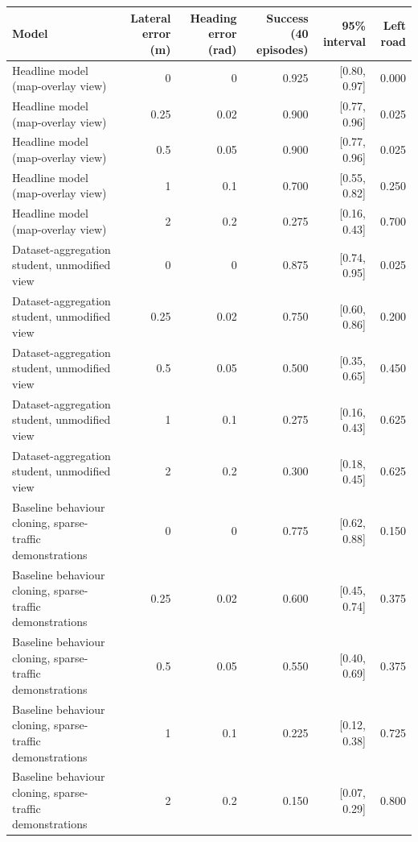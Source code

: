 \begin{tabular}{@{}lrrrrr@{}}\toprule
Model & Lateral error (m) & Heading error (rad) & Success (40 episodes) & 95\% interval & Left road\\\midrule
Headline model (map-overlay view) & 0 & 0 & 0.925 & [0.80, 0.97] & 0.000\\
Headline model (map-overlay view) & 0.25 & 0.02 & 0.900 & [0.77, 0.96] & 0.025\\
Headline model (map-overlay view) & 0.5 & 0.05 & 0.900 & [0.77, 0.96] & 0.025\\
Headline model (map-overlay view) & 1 & 0.1 & 0.700 & [0.55, 0.82] & 0.250\\
Headline model (map-overlay view) & 2 & 0.2 & 0.275 & [0.16, 0.43] & 0.700\\
Dataset-aggregation student, unmodified view & 0 & 0 & 0.875 & [0.74, 0.95] & 0.025\\
Dataset-aggregation student, unmodified view & 0.25 & 0.02 & 0.750 & [0.60, 0.86] & 0.200\\
Dataset-aggregation student, unmodified view & 0.5 & 0.05 & 0.500 & [0.35, 0.65] & 0.450\\
Dataset-aggregation student, unmodified view & 1 & 0.1 & 0.275 & [0.16, 0.43] & 0.625\\
Dataset-aggregation student, unmodified view & 2 & 0.2 & 0.300 & [0.18, 0.45] & 0.625\\
Baseline behaviour cloning, sparse-traffic demonstrations & 0 & 0 & 0.775 & [0.62, 0.88] & 0.150\\
Baseline behaviour cloning, sparse-traffic demonstrations & 0.25 & 0.02 & 0.600 & [0.45, 0.74] & 0.375\\
Baseline behaviour cloning, sparse-traffic demonstrations & 0.5 & 0.05 & 0.550 & [0.40, 0.69] & 0.375\\
Baseline behaviour cloning, sparse-traffic demonstrations & 1 & 0.1 & 0.225 & [0.12, 0.38] & 0.725\\
Baseline behaviour cloning, sparse-traffic demonstrations & 2 & 0.2 & 0.150 & [0.07, 0.29] & 0.800\\
\bottomrule\end{tabular}

